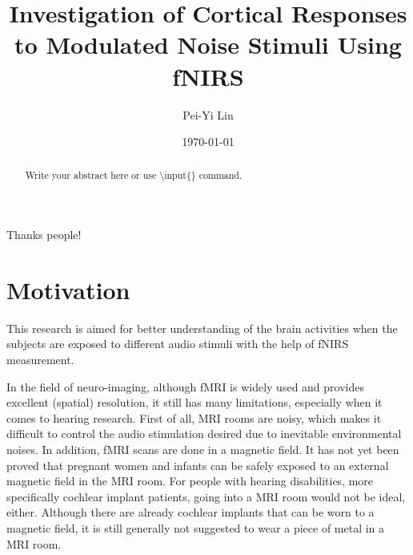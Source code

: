 \documentclass[a4paper, 12pt, twoside]{report}
\author{Pei-Yi Lin}
\title{Investigation of Cortical Responses to Modulated Noise Stimuli Using fNIRS}
\date{\today}
\begin{document}
\maketitle{}


\begin{abstract}
  Write your abstract here or use \textbackslash{}input\{\} command.

  
\end{abstract}
\cleardoublepage{}


\begin{acknowledgments}
Thanks people!
\end{acknowledgments}


% 



\cleardoublepage{}
\tableofcontents
\cleardoublepage{}



%

\chapter{Motivation}
This research is aimed for better understanding of the brain activities when the subjects are exposed to different audio stimuli with the help of fNIRS measurement.

In the field of neuro-imaging, although fMRI is widely used and provides excellent (spatial) resolution, it still has many limitations, especially when it comes to hearing research. First of all, MRI rooms are noisy, which makes it difficult to control the audio stimulation desired due to inevitable environmental noises. In addition, fMRI scans are done in a magnetic field. It has not yet been proved that pregnant women and infants can be safely exposed to an external magnetic field in the MRI room. For people with hearing disabilities, more specifically cochlear implant patients, going into a MRI room would not be ideal, either. Although there are already cochlear implants that can be worn to a magnetic field, it is still generally not suggested to wear a piece of metal in a MRI room.
\end{document}
